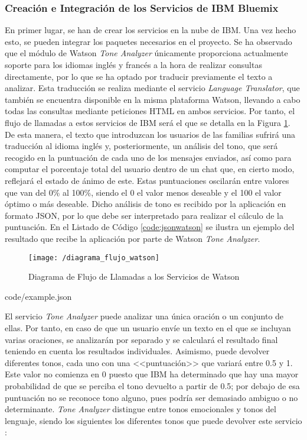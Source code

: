 \subsubsection{Creación e Integración de los Servicios de IBM Bluemix}
En primer lugar, se han de crear los servicios en la nube de IBM. Una vez hecho esto, se pueden integrar los paquetes necesarios en el proyecto. Se ha observado que el módulo de Watson \textit{Tone Analyzer} únicamente proporciona actualmente soporte para los idiomas inglés y francés a la hora de realizar consultas directamente, por lo que se ha optado por traducir previamente el texto a analizar. Esta traducción se realiza mediante el servicio \textit{Language Translator}, que también se encuentra disponible en la misma plataforma Watson, llevando a cabo todas las consultas mediante peticiones HTML en ambos servicios. Por tanto, el flujo de llamadas a estos servicios de IBM será el que se detalla en la Figura \ref{fig:diaflujo}. De esta manera, el texto que introduzcan los usuarios de las familias sufrirá una traducción al idioma inglés y, posteriormente, un análisis del tono, que será recogido en la puntuación de cada uno de los mensajes enviados, así como para computar el porcentaje total del usuario dentro de un chat que, en cierto modo, reflejará el estado de ánimo de este. Estas puntuaciones oscilarán entre valores que van del 0\% al 100\%, siendo el 0 el valor menos deseable y el 100 el valor óptimo o más deseable. Dicho análisis de tono es recibido por la aplicación en formato \acf{JSON}, por lo que debe ser interpretado para realizar el cálculo de la puntuación. En el Listado de Código \ref{code:jsonwatson} se ilustra un ejemplo del resultado que recibe la aplicación por parte de Watson \textit{Tone Analyzer}.

\begin{figure}[!h]
	\begin{center}
		\texttt{[image: /diagrama\_flujo\_watson]}
		\caption{Diagrama de Flujo de Llamadas a los Servicios de Watson}
		\label{fig:diaflujo}
	\end{center}
\end{figure}


						{code/example.json}

El servicio \textit{Tone Analyzer} puede analizar una única oración o un conjunto de ellas. Por tanto, en caso de que un usuario envíe un texto en el que se incluyan varias oraciones, se analizarán por separado y se calculará el resultado final teniendo en cuenta los resultados individuales. Asimismo, puede devolver diferentes tonos, cada uno con una <<puntuación>> que variará entre 0.5 y 1. Este valor no comienza en 0 puesto que IBM ha determinado que hay una mayor probabilidad de que se perciba el tono devuelto a partir de 0.5; por debajo de esa puntuación no se reconoce tono alguno, pues podría ser demasiado ambiguo o no determinante. \textit{Tone Analyzer} distingue entre tonos emocionales y tonos del lenguaje, siendo los siguientes los diferentes tonos que puede devolver este servicio \cite{IBM2018}:

